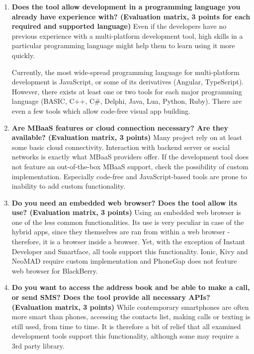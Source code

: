 \documentclass[english,master,public,dept460,male,cpdeclaration,oneside]{diploma}
\begin{document}
\begin{enumerate}
	\item \textbf{Does the tool allow development in a programming language you already have experience with? (Evaluation matrix, 3 points for each required and supported language) }
	Even if the developers have no previous experience with a multi-platform development tool, high skills in a particular programming language might help them to learn using it more quickly. 
	
	Currently, the most wide-spread programming language for multi-platform development is JavaScript, or some of its derivatives (Angular, TypeScript). However, there exists at least one or two tools for each major programming language (BASIC, C++, C\#, Delphi, Java, Lua, Python, Ruby). There are even a few tools which allow code-free visual app building.
	
	\item \textbf{Are MBaaS features or cloud connection necessary? Are they available? (Evaluation matrix, 3 points) }
	Many project rely on at least some basic cloud connectivity. Interaction with backend server or social networks is exactly what MBaaS providers offer. If the development tool does not feature an out-of-the-box MBaaS support, check the possibility of custom implementation. Especially code-free and JavaScript-based tools are prone to inability to add custom functionality.
	
	\item \textbf{Do you need an embedded web browser? Does the tool allow its use? (Evaluation matrix, 3 points) }
	Using an embedded web browser is one of the less common functionalities. Its use is very peculiar in case of the hybrid apps, since they themselves are ran from within a web browser - therefore, it is a browser inside a browser. Yet, with the exception of Instant Developer and Smartface, all tools support this functionality. Ionic, Kivy and NeoMAD require custom implementation and PhoneGap does not feature web browser for BlackBerry.
	
	\item \textbf{Do you want to access the address book and be able to make a call, or send SMS? Does the tool provide all necessary APIs? (Evaluation matrix, 3 points) }
	While contemporary smartphones are often more smart than phones, accessing the contacts list, making calls or texting is still used, from time to time. It is therefore a bit of relief that all examined development tools support this functionality, although some may require a 3rd party library.
	

\end{enumerate}
\end{document}
